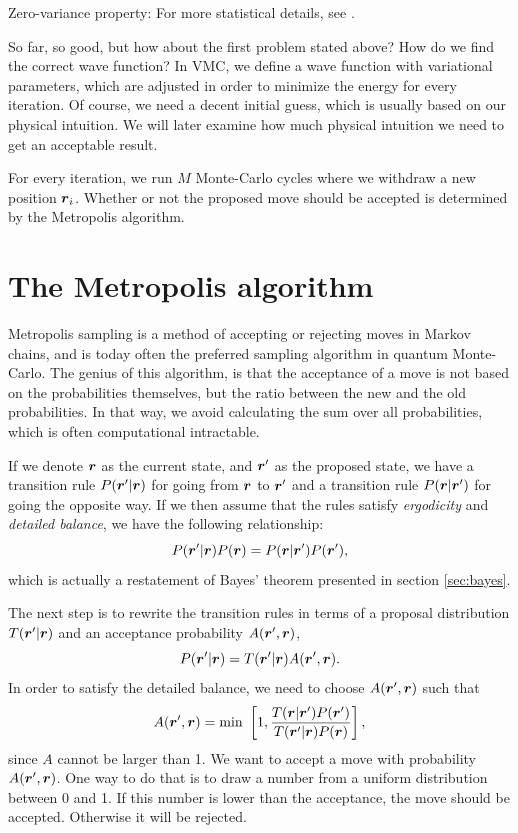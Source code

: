 Zero-variance property: 
For more statistical details, see \cite{deb_variational_2014}. 

So far, so good, but how about the first problem stated above? How do we find the correct wave function? In VMC, we define a wave function with variational parameters, which are adjusted in order to minimize the energy for every iteration. Of course, we need a decent initial guess, which is usually based on our physical intuition. We will later examine how much physical intuition we need to get an acceptable result. 

For every iteration, we run $M$ Monte-Carlo cycles where we withdraw a new position $\boldsymbol{{r}}_i$. Whether or not the proposed move should be accepted is determined by the Metropolis algorithm.

\section{The Metropolis algorithm}
Metropolis sampling is a method of accepting or rejecting moves in Markov chains, and is today often the preferred sampling algorithm in quantum Monte-Carlo. The genius of this algorithm, is that the acceptance of a move is not based on the probabilities themselves, but the ratio between the new and the old probabilities. In that way, we avoid calculating the sum over all probabilities, which is often computational intractable. 

If we denote $\boldsymbol{{r}}$ as the current state, and $\boldsymbol{{r}}'$ as the proposed state, we have a transition rule $P(\boldsymbol{{r}}'|\boldsymbol{{r}})$ for going from $\boldsymbol{{r}}$ to $\boldsymbol{{r}}'$ and a transition rule $P(\boldsymbol{{r}}|\boldsymbol{{r}}')$ for going the opposite way. If we then assume that the rules satisfy \textit{ergodicity} and \textit{detailed balance}, we have the following relationship:
\begin{equation}
P(\boldsymbol{{r}}'|\boldsymbol{{r}})P(\boldsymbol{{r}})=P(\boldsymbol{{r}}|\boldsymbol{{r}}')P(\boldsymbol{{r}}'),
\end{equation}
which is actually a restatement of Bayes' theorem presented in section \ref{sec:bayes}.

The next step is to rewrite the transition rules in terms of a proposal distribution $T(\boldsymbol{{r}}'|\boldsymbol{{r}})$ and an acceptance probability $A(\boldsymbol{{r}}',\boldsymbol{{r}})$,
\begin{equation}
P(\boldsymbol{{r}}'|\boldsymbol{{r}})=T(\boldsymbol{{r}}'|\boldsymbol{{r}})A(\boldsymbol{{r}}',\boldsymbol{{r}}).
\end{equation}
In order to satisfy the detailed balance, we need to choose $A(\boldsymbol{{r}}',\boldsymbol{{r}})$ such that
\begin{equation}
A(\boldsymbol{{r}}',\boldsymbol{{r}})=\text{min }\left[1,\frac{T(\boldsymbol{{r}}|\boldsymbol{{r}}')P(\boldsymbol{{r}}')}{T(\boldsymbol{{r}}'|\boldsymbol{{r}})P(\boldsymbol{{r}})}\right],
\label{eq:acceptance}
\end{equation}
since $A$ cannot be larger than 1. We want to accept a move with probability $A(\boldsymbol{{r}}',\boldsymbol{{r}})$. One way to do that is to draw a number from a uniform distribution between 0 and 1. If this number is lower than the acceptance, the move should be accepted. Otherwise it will be rejected.

